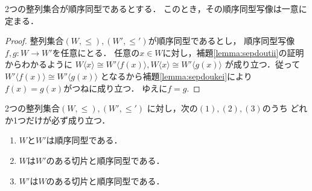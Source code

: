  \begin{thm} \label{thm:seiretudoukei}
    2つの整列集合が順序同型であるとする．
    このとき，その順序同型写像は一意に定まる．
  \end{thm}

  \begin{proof}
    整列集合$(W, {\leq} ) , (W' , {\leq'})$が順序同型であるとし，
    順序同型写像$f, g : W \longrightarrow W'$を任意にとる．
    任意の$x \in W$に対し，補題\ref{lemma:sepdoutii}の証明からわかるように
    $W \langle x \rangle \cong W' \langle f(x) \rangle ,
    W \langle x \rangle \cong W' \langle g(x) \rangle$
    が成り立つ．従って$W' \langle f(x) \rangle \cong W' \langle g(x) \rangle$
    となるから補題\ref{lemma:sepdoukei}により
    $f(x)=g(x)$がつねに成り立つ．
    ゆえに$f=g.$
  \end{proof}

  \begin{thm}[整列集合の比較定理] \label{thm:hikakuteiri}
    2つの整列集合$(W, {\leq }), (W', {\leq'})$
    に対し，次の$(1),(2),(3)$のうち
    どれか1つだけが必ず成り立つ．
    \begin{enumerate}[(1) ]
      \item $W$と$W'$は順序同型である．
      \item $W$は$W'$のある切片と順序同型である．
      \item $W'$は$W$のある切片と順序同型である．
    \end{enumerate}
  \end{thm}


